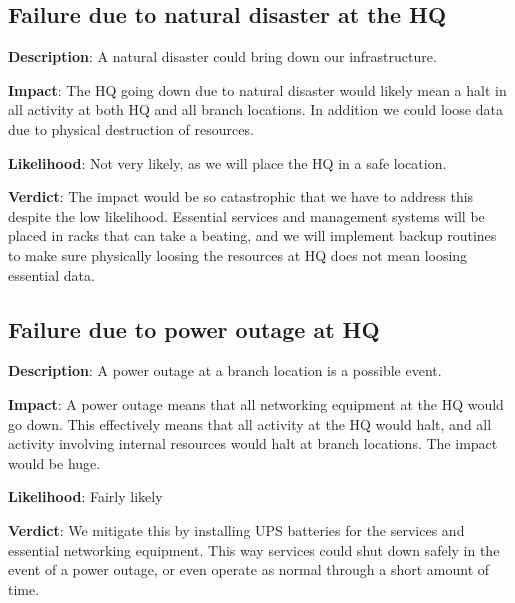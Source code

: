 \subsection{Failure due to natural disaster at the HQ}

\textbf{Description}: A natural disaster could bring down our infrastructure.

\textbf{Impact}: The HQ going down due to natural disaster would likely mean a halt in all activity at both HQ and all branch locations. In addition we could loose data due to physical destruction of resources.

\textbf{Likelihood}: Not very likely, as we will place the HQ in a safe location.

\textbf{Verdict}: The impact would be so catastrophic that we have to address this despite the low likelihood. Essential services and management systems will be placed in racks that can take a beating\cite{todo}, and we will implement backup routines to make sure physically loosing the resources at HQ does not mean loosing essential data.

\subsection{Failure due to power outage at HQ}

\textbf{Description}: A power outage at a branch location is a possible event.

\textbf{Impact}: A power outage means that all networking equipment at the HQ would go down. This effectively means that all activity at the HQ would halt, and all activity involving internal resources would halt at branch locations. The impact would be huge.

\textbf{Likelihood}: Fairly likely

\textbf{Verdict}: We mitigate this by installing UPS batteries for the services and essential networking equipment. This way services could shut down safely in the event of a power outage, or even operate as normal through a short amount of time.


